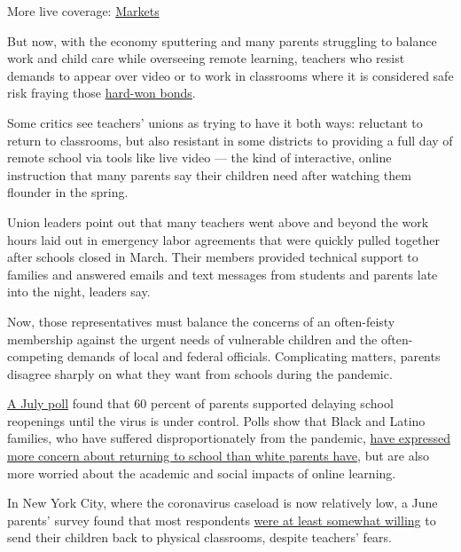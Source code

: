 More live coverage:
\href{https://www.nytimes.com/live/2020/08/03/business/stock-market-today-coronavirus?action=click\&pgtype=Article\&state=default\&region=MAIN_CONTENT_1\&context=storylines_live_updates}{Markets}

But now, with the economy sputtering and many parents struggling to
balance work and child care while overseeing remote learning, teachers
who resist demands to appear over video or to work in classrooms where
it is considered safe risk fraying those
\href{https://www.nytimes.com/2020/07/11/us/virus-teachers-classrooms.html}{hard-won
bonds}.

Some critics see teachers' unions as trying to have it both ways:
reluctant to return to classrooms, but also resistant in some districts
to providing a full day of remote school via tools like live video ---
the kind of interactive, online instruction that many parents say their
children need after watching them flounder in the spring.

Union leaders point out that many teachers went above and beyond the
work hours laid out in emergency labor agreements that were quickly
pulled together after schools closed in March. Their members provided
technical support to families and answered emails and text messages from
students and parents late into the night, leaders say.

Now, those representatives must balance the concerns of an often-feisty
membership against the urgent needs of vulnerable children and the
often-competing demands of local and federal officials. Complicating
matters, parents disagree sharply on what they want from schools during
the pandemic.

\href{https://www.kff.org/coronavirus-covid-19/report/kff-health-tracking-poll-july-2020/}{A
July poll} found that 60 percent of parents supported delaying school
reopenings until the virus is under control. Polls show that Black and
Latino families, who have suffered disproportionately from the pandemic,
\href{https://www.chalkbeat.org/2020/7/14/21324873/school-closure-reopening-parents-surveys}{have
expressed more concern about returning to school than white parents
have}, but are also more worried about the academic and social impacts
of online learning.

In New York City, where the coronavirus caseload is now relatively low,
a June parents' survey found that most respondents
\href{https://www.nytimes.com/2020/07/06/nyregion/nyc-school-reopening-plan.html}{were
at least somewhat willing} to send their children back to physical
classrooms, despite teachers' fears.

